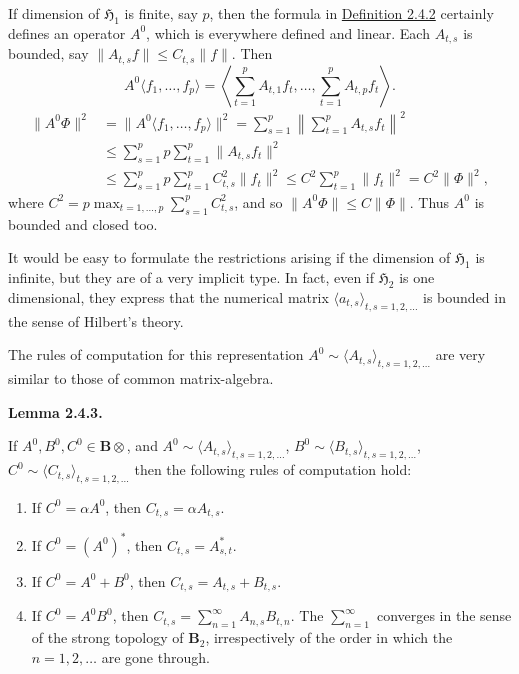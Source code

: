 \documentclass[12pt,b5paper,twoside]{article}
\newcommand{\Hspace}{\mathfrak H}
\newcommand{\B}{\mathbf B}
\newcommand{\Lemma}[1]{%
  \par\smallskip\noindent\phantomsection\label{lem:#1}\textbf{Lemma #1.}\enspace
}
\newcommand{\defref}[1]{\hyperref[def:#1]{Definition #1}}
\begin{document}
If dimension of $\Hspace_1$ is finite, say $p$, then the formula in
\defref{2.4.2} certainly defines an operator $A^0$, which is everywhere
defined and linear. Each $A_{t,s}$ is bounded, say
$\lVert A_{t,s}f\rVert\leq C_{t,s}\lVert f\rVert$. Then
\[
 A^0\langle f_1,\ldots,f_p\rangle
 =\left\langle\sum_{t=1}^{p}A_{t,1}f_t,\ldots,
                 \sum_{t=1}^{p}A_{t,p}f_t\right\rangle.
\]
\begin{align*}
 \lVert A^0\Phi\rVert^2
 &=\lVert A^0\langle f_1,\ldots,f_p\rangle\rVert^2
  =\sum_{s=1}^{p}\left\lVert\sum_{t=1}^{p}A_{t,s}f_t\right\rVert^2\\
 &\leq\sum_{s=1}^{p}p\sum_{t=1}^{p}\lVert A_{t,s}f_t\rVert^2\\
 &\leq\sum_{s=1}^{p}p\sum_{t=1}^{p}C_{t,s}^2\lVert f_t\rVert^2
  \leq C^2\sum_{t=1}^{p}\lVert f_t\rVert^2=C^2\lVert\Phi\rVert^2,
\end{align*}
where
$C^2=p\max_{t=1,\ldots,p}\sum_{s=1}^{p}C_{t,s}^2$, and so
$\lVert A^0\Phi\rVert\leq C\lVert\Phi\rVert$. Thus $A^0$ is bounded and
closed too.

It would be easy to formulate the restrictions arising if the dimension of
$\Hspace_1$ is infinite, but they are of a very implicit type. In fact, even
if $\Hspace_2$ is one dimensional, they express that the numerical matrix
$\langle a_{t,s}\rangle_{t,s=1,2,\ldots}$ is bounded in the sense of Hilbert's
theory.

The rules of computation for this representation
$A^0\sim\langle A_{t,s}\rangle_{t,s=1,2,\ldots}$ are very similar to those of
common matrix-algebra.

\Lemma{2.4.3}
If $A^0,B^0,C^0\in\B\otimes$, and
$A^0\sim\langle A_{t,s}\rangle_{t,s=1,2,\ldots}$,
$B^0\sim\langle B_{t,s}\rangle_{t,s=1,2,\ldots}$,
$C^0\sim\langle C_{t,s}\rangle_{t,s=1,2,\ldots}$ then the following rules of
computation hold:
\begin{enumerate}[label=(\roman*)]
\item If $C^0=\alpha A^0$, then $C_{t,s}=\alpha A_{t,s}$.
\item If $C^0=(A^0)^*$, then $C_{t,s}=A_{s,t}^*$.
\item If $C^0=A^0+B^0$, then $C_{t,s}=A_{t,s}+B_{t,s}$.
\item If $C^0=A^0B^0$, then
  $C_{t,s}=\sum_{n=1}^{\infty}A_{n,s}B_{t,n}$. The
  $\sum_{n=1}^{\infty}$ converges in the sense of the strong topology of
  $\B_2$, irrespectively of the order in which the $n=1,2,\ldots$ are gone
  through.
\end{enumerate}
\end{document}
